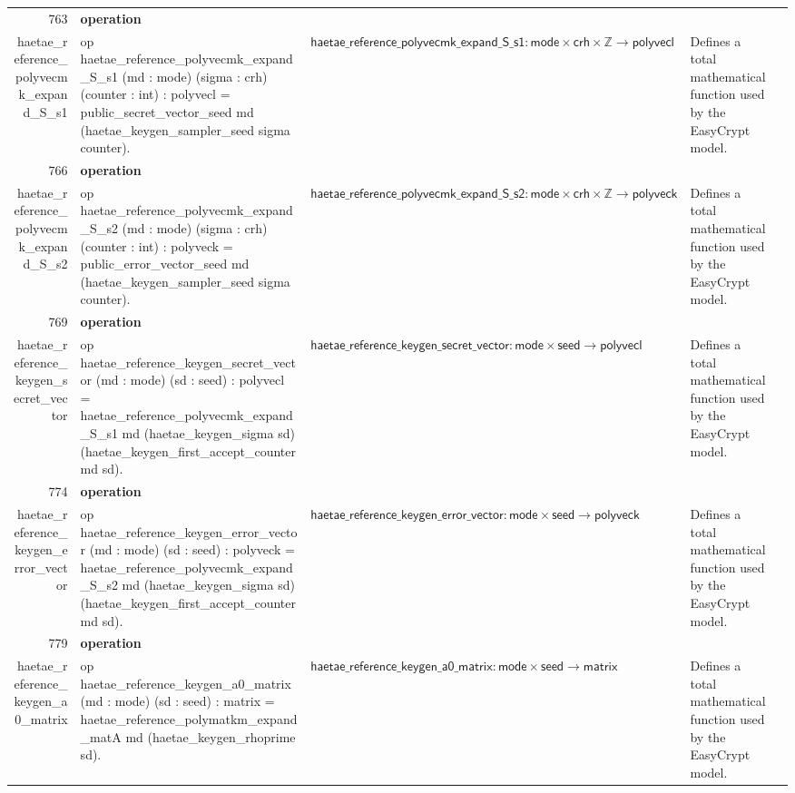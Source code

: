 \documentclass[10pt]{article}
\newcommand{\ec}[1]{\begingroup\ttfamily\scriptsize #1\endgroup}
\begin{document}
\begin{longtable}{r L{0.17\textwidth} L{0.26\textwidth} L{0.27\textwidth} L{0.20\textwidth}}
763 & \textbf{operation}\\\ec{haetae\_reference\_polyvecmk\_expand\_S\_s1} & \ec{op haetae\_reference\_polyvecmk\_expand\_S\_s1 (md : mode) (sigma : crh) (counter : int) : polyvecl = public\_secret\_vector\_seed md (haetae\_keygen\_sampler\_seed sigma counter).} & \(\mathsf{haetae\_reference\_polyvecmk\_expand\_S\_s1} : \mathsf{mode} \times \mathsf{crh} \times \mathbb{Z} \to \mathsf{polyvecl}\) & Defines a total mathematical function used by the EasyCrypt model. \\
766 & \textbf{operation}\\\ec{haetae\_reference\_polyvecmk\_expand\_S\_s2} & \ec{op haetae\_reference\_polyvecmk\_expand\_S\_s2 (md : mode) (sigma : crh) (counter : int) : polyveck = public\_error\_vector\_seed md (haetae\_keygen\_sampler\_seed sigma counter).} & \(\mathsf{haetae\_reference\_polyvecmk\_expand\_S\_s2} : \mathsf{mode} \times \mathsf{crh} \times \mathbb{Z} \to \mathsf{polyveck}\) & Defines a total mathematical function used by the EasyCrypt model. \\
769 & \textbf{operation}\\\ec{haetae\_reference\_keygen\_secret\_vector} & \ec{op haetae\_reference\_keygen\_secret\_vector (md : mode) (sd : seed) : polyvecl = haetae\_reference\_polyvecmk\_expand\_S\_s1 md (haetae\_keygen\_sigma sd) (haetae\_keygen\_first\_accept\_counter md sd).} & \(\mathsf{haetae\_reference\_keygen\_secret\_vector} : \mathsf{mode} \times \mathsf{seed} \to \mathsf{polyvecl}\) & Defines a total mathematical function used by the EasyCrypt model. \\
774 & \textbf{operation}\\\ec{haetae\_reference\_keygen\_error\_vector} & \ec{op haetae\_reference\_keygen\_error\_vector (md : mode) (sd : seed) : polyveck = haetae\_reference\_polyvecmk\_expand\_S\_s2 md (haetae\_keygen\_sigma sd) (haetae\_keygen\_first\_accept\_counter md sd).} & \(\mathsf{haetae\_reference\_keygen\_error\_vector} : \mathsf{mode} \times \mathsf{seed} \to \mathsf{polyveck}\) & Defines a total mathematical function used by the EasyCrypt model. \\
779 & \textbf{operation}\\\ec{haetae\_reference\_keygen\_a0\_matrix} & \ec{op haetae\_reference\_keygen\_a0\_matrix (md : mode) (sd : seed) : matrix = haetae\_reference\_polymatkm\_expand\_matA md (haetae\_keygen\_rhoprime sd).} & \(\mathsf{haetae\_reference\_keygen\_a0\_matrix} : \mathsf{mode} \times \mathsf{seed} \to \mathsf{matrix}\) & Defines a total mathematical function used by the EasyCrypt model. \\

\end{longtable}
\end{document}
